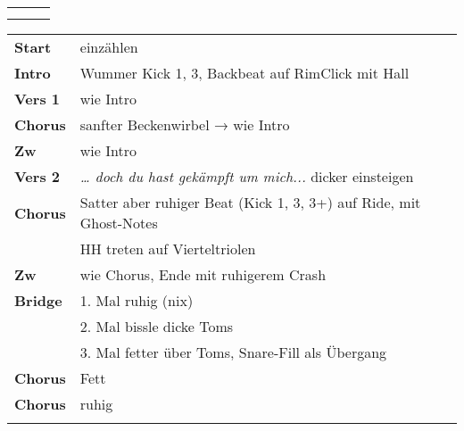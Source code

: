 

\begin{tabular}{p{0.6cm}p{12cm}p{1.4cm}}
	\rowcolor{cyan} \myRow{\thesongnumber} & \myRow{Gewagte Liebe} & \myRow{54t} \\
	                                       &                       &             \\
\end{tabular}

\begin{tabular}{p{1.6cm}l}
	\textbf{Start}  & einzählen                                                          \\
	\textbf{Intro}  & Wummer Kick 1, 3, Backbeat auf RimClick mit Hall                   \\
	\textbf{Vers 1} & wie Intro                                                          \\
	\textbf{Chorus} & sanfter Beckenwirbel → wie Intro                                   \\
	\textbf{Zw}     & wie Intro                                                          \\
	\textbf{Vers 2} & \textit{… doch du hast gekämpft um mich...} dicker einsteigen      \\
	\textbf{Chorus} & Satter aber ruhiger Beat (Kick 1, 3, 3+) auf Ride, mit Ghost-Notes \\
	                & HH treten auf Vierteltriolen                                       \\
	\textbf{Zw}     & wie Chorus, Ende mit ruhigerem Crash                               \\
	\textbf{Bridge} & 1. Mal ruhig (nix)                                                 \\
	                & 2. Mal bissle dicke Toms                                           \\
	                & 3. Mal fetter über Toms, Snare-Fill als Übergang                   \\
	\textbf{Chorus} & Fett                                                               \\
	\textbf{Chorus} & ruhig                                                              \\
	                &                                                                    \\
\end{tabular}